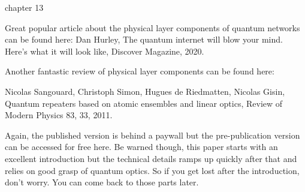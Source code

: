 chapter 13

Great popular article about the physical layer components of quantum networks can be found here:
Dan Hurley, The quantum internet will blow your mind. Here’s what it will look like, Discover Magazine, 2020.

Another fantastic review of physical layer components can be found here:

Nicolas Sangouard, Christoph Simon, Hugues de Riedmatten, Nicolas Gisin, Quantum repeaters based on atomic ensembles and linear optics, Review of Modern Physics 83, 33, 2011.

Again, the published version is behind a paywall but the pre-publication version can be accessed for free here. Be warned though, this paper starts with an excellent introduction but the technical details ramps up quickly after that and relies on good grasp of quantum optics. So if you get lost after the introduction, don’t worry. You can come back to those parts later.
